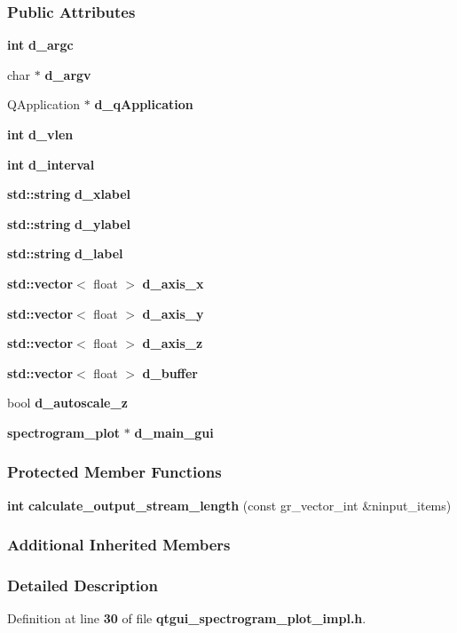 \subsubsection*{Public Attributes}
\begin{DoxyCompactItemize}
\item 
{\bf int} {\bf d\+\_\+argc}
\item 
char $\ast$ {\bf d\+\_\+argv}
\item 
Q\+Application $\ast$ {\bf d\+\_\+q\+Application}
\item 
{\bf int} {\bf d\+\_\+vlen}
\item 
{\bf int} {\bf d\+\_\+interval}
\item 
{\bf std\+::string} {\bf d\+\_\+xlabel}
\item 
{\bf std\+::string} {\bf d\+\_\+ylabel}
\item 
{\bf std\+::string} {\bf d\+\_\+label}
\item 
{\bf std\+::vector}$<$ float $>$ {\bf d\+\_\+axis\+\_\+x}
\item 
{\bf std\+::vector}$<$ float $>$ {\bf d\+\_\+axis\+\_\+y}
\item 
{\bf std\+::vector}$<$ float $>$ {\bf d\+\_\+axis\+\_\+z}
\item 
{\bf std\+::vector}$<$ float $>$ {\bf d\+\_\+buffer}
\item 
bool {\bf d\+\_\+autoscale\+\_\+z}
\item 
{\bf spectrogram\+\_\+plot} $\ast$ {\bf d\+\_\+main\+\_\+gui}
\end{DoxyCompactItemize}
\subsubsection*{Protected Member Functions}
\begin{DoxyCompactItemize}
\item 
{\bf int} {\bf calculate\+\_\+output\+\_\+stream\+\_\+length} (const gr\+\_\+vector\+\_\+int \&ninput\+\_\+items)
\end{DoxyCompactItemize}
\subsubsection*{Additional Inherited Members}


\subsubsection{Detailed Description}


Definition at line {\bf 30} of file {\bf qtgui\+\_\+spectrogram\+\_\+plot\+\_\+impl.\+h}.



